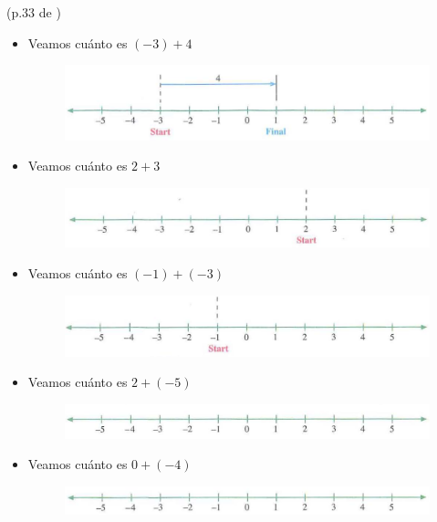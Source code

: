 \begin{ejemplo}
	(p.33 de \cite{Dimensions_Math_7A})
	\begin{itemize}
			\item Veamos cuánto es $(-3)+4$
					\begin{figure}[H]
						\centering
						\includegraphics[width=0.7\linewidth]{Algebra/imgs/DM7A_p33_1a}
						\label{DM7A_p33_1a}
					\end{figure}
			\item Veamos cuánto es $2+3$
					\begin{figure}[H]
						\centering
						\includegraphics[width=0.7\linewidth]{Algebra/imgs/DM7A_p33_1B}
						\label{DM7A_p33_1B}
					\end{figure}
			\item Veamos cuánto es $(-1)+(-3)$
					\begin{figure}[H]
						\centering
						\includegraphics[width=0.7\linewidth]{Algebra/imgs/DM7A_p33_2a}
						\label{DM7A_p33_2a}
					\end{figure}
			\item Veamos cuánto es $2+(-5)$		
					\begin{figure}[H]
						\centering
						\includegraphics[width=0.7\linewidth]{Algebra/imgs/DM7A_p33_2b}
						\label{DM7A_p33_2b}
					\end{figure}
			\item Veamos cuánto es $0+(-4)$		
					\begin{figure}[H]
						\centering
						\includegraphics[width=0.7\linewidth]{Algebra/imgs/DM7A_p33_2c}
						\label{DM7A_p33_2c}
					\end{figure}					
	\end{itemize}
\end{ejemplo}

